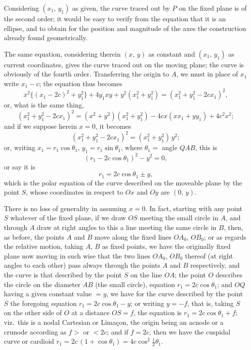\documentclass[11pt]{article}
\begin{document}
Considering $(x_1,\,y_1)$ as given, the curve traced out by $P$ on the fixed plane is
of the second order; it would be easy to verify from the equation that it is an
ellipse, and to obtain for the position and magnitude of the axes the construction
already found geometrically.

The same equation, considering therein $(x,\,y)$ as constant and $(x_1,\,y_1)$ as current
coordinates, gives the curve traced out on the moving plane; the curve is obviously
of the fourth order. Transferring the origin to $A$, we must in place of $x_1$ write
$x_1 - c$; the equation thus becomes
\[
   x^2 \bigl\{(x_1 - 2c)^2 + y_1^2\bigr\} + 4y_1 xy + y^2 (x_1^2 + y_1^2) = (x_1^2 + y_1^2 - 2cx_1)^2,
\]
or, what is the same thing,
\[
  (x_1^2 + y_1^2 - 2cx_1)^2 = (x^2 + y^2)(x_1^2 + y_1^2) - 4cx(xx_1 + yy_1) + 4c^2 x^2;
\]
and if we suppose herein $x = 0$, it becomes
\[
   (x_1^2 + y_1^2 - 2cx_1)^2 = (x_1^2 + y_1^2)\,y^2;
\]
or, writing $x_1 = r_1 \cos\theta_1$, $y_1 = r_1 \sin\theta_1$, where $\theta_1 = $ angle $QAB$, this is
\[
   (r_1 - 2c\cos\theta_1)^2 - y^2 = 0,
\]
or say it is
\[
   r_1 = 2c\cos\theta_1 \pm y,
\]
which is the polar equation of the curve described on the moveable plane by the
point $S$, whose coordinates in respect to $Ox$ and $Oy$ are $(0,\,y)$.

There is no loss of generality in assuming $x = 0$. In fact, starting with any point
$S$ whatever of the fixed plane, if we draw $OS$ meeting the small circle in $A$, and
through $A$ draw at right angles to this a line meeting the same circle in $B$, then,
as before, the points $A$ and $B$ move along the fixed lines $OA_0$, $OB_0$; or as regards
the relative motion, taking $A,\,B$ as fixed points, we have the originally fixed plane
now moving in such wise that the two lines $OA_0$, $OB_0$ thereof (at right angles to
each other) pass always through the points $A$ and $B$ respectively, and the curve is
that described by the point $S$ on the line $OA$; the point $O$ describes the circle on
the diameter $AB$ (the small circle), equation $r_1 = 2c\cos\theta_1$; and $OQ$ having a given
constant value $= y$, we have for the curve described by the point $S$ the foregoing
equation $r_1 = 2c\cos\theta_1 - y$; or writing $y = -f$, that is, taking $S$ on the other side of
$O$ at a distance $OS = f$, the equation is $r_1 = 2c\cos\theta_1 + f$; viz.\ this is a nodal Cartesian
or Lima\c{c}on, the origin being an acnode or a crunode according as $f > $ or $< 2c$; and
if $f = 2c$, then we have the cuspidal curve or cardioid $r_1 = 2c\,(1 + \cos\theta_1) = 4c\cos^2\tfrac{1}{2}\theta_1$.
\end{document}

